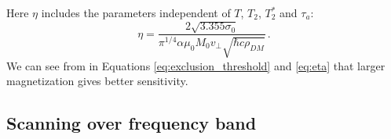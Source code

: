 \documentclass{WileyMSP-template}
\newcommand{\AW}[1]{\textcolor{cyan}{Arne: #1}}
\begin{document}
	Here $\eta$ includes the parameters independent of $T$, $T_2$, $T_2^*$ and $\tau_a$:
	\begin{equation}
		\eta = \dfrac{2  \sqrt{3.355 \sigma_0} }{\pi^{1/4} \alpha \mu_0 M_0  v_{\bot} \sqrt{\hbar c \rho_{DM}} }
		\,.\label{eq:eta}
	\end{equation}
	We can see from in Equations \eqref{eq:exclusion_threshold} and \eqref{eq:eta} that larger magnetization gives better sensitivity. 

	
	\subsection{Scanning over frequency band}
\end{document}
